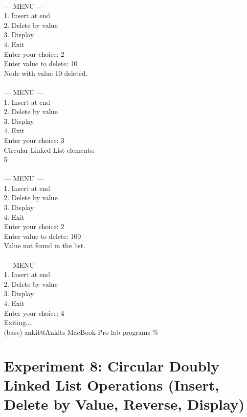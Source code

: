 \documentclass[12pt,a4paper]{article}
\begin{document}
\begin{tcolorbox}[terminalstyle, title=Sample Output]
{\\
--- MENU ---\\
1. Insert at end\\
2. Delete by value\\
3. Display\\
4. Exit\\
Enter your choice: 2\\
Enter value to delete: 10\\
Node with value 10 deleted.\\
\\
--- MENU ---\\
1. Insert at end\\
2. Delete by value\\
3. Display\\
4. Exit\\
Enter your choice: 3\\
Circular Linked List elements:\\
5 \\
\\
--- MENU ---\\
1. Insert at end\\
2. Delete by value\\
3. Display\\
4. Exit\\
Enter your choice: 2\\
Enter value to delete: 100\\
Value not found in the list.\\
\\
--- MENU ---\\
1. Insert at end\\
2. Delete by value\\
3. Display\\
4. Exit\\
Enter your choice: 4\\
Exiting...\\
(base) ankit@Ankits-MacBook-Pro lab programs \%
}
\end{tcolorbox}

\newpage
\section*{Experiment 8: Circular Doubly Linked List Operations (Insert, Delete by Value, Reverse, Display)}
\end{document}
